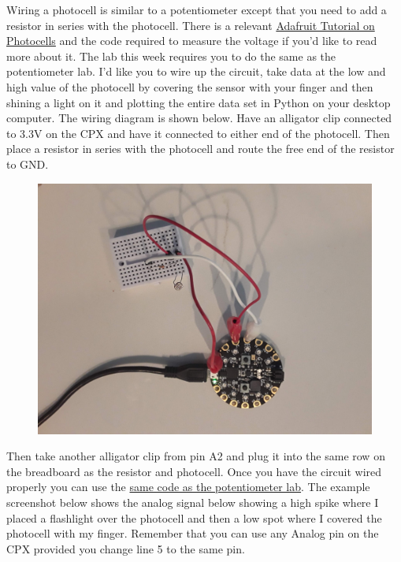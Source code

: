 Wiring a photocell is similar to a potentiometer except that you need to add a resistor in series with the photocell. There is a relevant \href{https://learn.adafruit.com/photocells/circuitpython}{Adafruit Tutorial on Photocells} and the code required to measure the voltage if you’d like to read more about it. The lab this week requires you to do the same as the potentiometer lab. I’d like you to wire up the circuit, take data at the low and high value of the photocell by covering the sensor with your finger and then shining a light on it and plotting the entire data set in Python on your desktop computer. The wiring diagram is shown below. Have an alligator clip connected to 3.3V on the CPX and have it connected to either end of the photocell. Then place a resistor in series with the photocell and route the free end of the resistor to GND.
\begin{figure}[H]
  \begin{center}
    \includegraphics[width=\textwidth]{Figures/photocell_circuit.jpeg}
  \end{center}
\end{figure}
Then take another alligator clip from pin A2 and plug it into the same row on the breadboard as the resistor and photocell. Once you have the circuit wired properly you can use the \href{https://github.com/cmontalvo251/Microcontrollers/blob/master/Circuit_Playground/CircuitPython/Analog/analog_simple.py}{same code as the potentiometer lab}. The example screenshot below shows the analog signal below showing a high spike where I placed a flashlight over the photocell and then a low spot where I covered the photocell with my finger. Remember that you can use any Analog pin on the CPX provided you change line 5 to the same pin.
